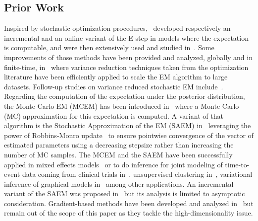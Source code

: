 \documentclass[bj]{imsart}
\numberwithin{equation}{section}
\theoremstyle{plain}
\begin{document}
\subsection{Prior Work}
Inspired by stochastic optimization procedures,~\citet{neal1998view,cappe2009line} developed respectively an incremental and an online variant of the {E-step} in models where the expectation is computable, and were then extensively used and studied in~\citet{nguyen2020mini, liang2009online,cappe2011online}.
Some improvements of those methods have been provided and analyzed, globally and in finite-time, in~\citet{karimi2019global} where variance reduction techniques taken from the optimization literature have been efficiently applied to scale the EM algorithm to large datasets. Follow-up studies on variance reduced stochastic EM include~\citet{fortem2020,fort2021geom}.
Regarding the computation of the expectation under the posterior distribution, the Monte Carlo EM (MCEM) has been introduced in~\citet{wei1990monte} where a Monte Carlo (MC) approximation for this expectation is computed. A variant of that algorithm is the Stochastic Approximation of the EM (SAEM) in~\citet{delyon1999} leveraging the power of Robbins-Monro update~\citep{robbins1951stochastic} to ensure pointwise convergence of the vector of estimated parameters using a decreasing stepsize rather than increasing the number of MC samples.
The MCEM and the SAEM have been successfully applied in mixed effects models~\citep{mcculloch1997maximum,hughes1999mixed,baey2016nonlinear} or to do inference for joint modeling of time-to-event data coming from clinical trials in~\citet{das2010Inferences}, unsupervised clustering in~\citet{ngChoice2003}, variational inference of graphical models in~\citet{BleiVariational2017} among other applications.
An incremental variant of the SAEM was proposed in~\citet{kuhn2019properties} but its analysis is limited to asymptotic consideration. 
Gradient-based methods have been developed and analyzed in~\citet{zhu2017high} but remain out of the scope of this paper as they tackle the high-dimensionality issue.
\end{document}
